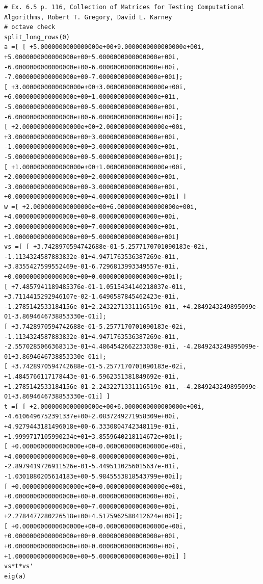 \documentclass[12pt]{article}
\begin{document}
{\fontsize{8.5pt}{0.4cm}\selectfont
\begin{verbatim}
# Ex. 6.5 p. 116, Collection of Matrices for Testing Computational Algorithms, Robert T. Gregory, David L. Karney
# octave check
split_long_rows(0)
a =[ [ +5.0000000000000000e+00+9.0000000000000000e+00i, +5.0000000000000000e+00+5.0000000000000000e+00i,
-6.0000000000000000e+00-6.0000000000000000e+00i, -7.0000000000000000e+00-7.0000000000000000e+00i];
[ +3.0000000000000000e+00+3.0000000000000000e+00i, +6.0000000000000000e+00+1.0000000000000000e+01i,
-5.0000000000000000e+00-5.0000000000000000e+00i, -6.0000000000000000e+00-6.0000000000000000e+00i];
[ +2.0000000000000000e+00+2.0000000000000000e+00i, +3.0000000000000000e+00+3.0000000000000000e+00i,
-1.0000000000000000e+00+3.0000000000000000e+00i, -5.0000000000000000e+00-5.0000000000000000e+00i];
[ +1.0000000000000000e+00+1.0000000000000000e+00i, +2.0000000000000000e+00+2.0000000000000000e+00i,
-3.0000000000000000e+00-3.0000000000000000e+00i, +0.0000000000000000e+00+4.0000000000000000e+00i] ]
w =[ +2.0000000000000000e+00+6.0000000000000000e+00i, +4.0000000000000000e+00+8.0000000000000000e+00i,
+3.0000000000000000e+00+7.0000000000000000e+00i, +1.0000000000000000e+00+5.0000000000000000e+00i]
vs =[ [ +3.7428970594742688e-01-5.2577170701090183e-02i, -1.1134324587883832e-01+4.9471763536387269e-01i,
+3.8355427599552469e-01-6.7296813993349557e-01i, +0.0000000000000000e+00+0.0000000000000000e+00i];
[ +7.4857941189485376e-01-1.0515434140218037e-01i, +3.7114415292946107e-02-1.6490587845462423e-01i,
-1.2785142533184156e-01+2.2432271331116519e-01i, +4.2849243249895099e-01-3.8694646738853330e-01i];
[ +3.7428970594742688e-01-5.2577170701090183e-02i, -1.1134324587883832e-01+4.9471763536387269e-01i,
-2.5570285066368313e-01+4.4864542662233038e-01i, -4.2849243249895099e-01+3.8694646738853330e-01i];
[ +3.7428970594742688e-01-5.2577170701090183e-02i, +1.4845766117178443e-01-6.5962351381849692e-01i,
+1.2785142533184156e-01-2.2432271331116519e-01i, -4.2849243249895099e-01+3.8694646738853330e-01i] ]
t =[ [ +2.0000000000000000e+00+6.0000000000000000e+00i, -4.6106496752391337e+00+2.0837249271958309e+00i,
+4.9279443181496018e+00-6.3330804742348119e-01i, +1.9999717105990234e+01+3.8559640218114672e+00i];
[ +0.0000000000000000e+00+0.0000000000000000e+00i, +4.0000000000000000e+00+8.0000000000000000e+00i,
-2.8979419726911526e-01-5.4495110256015637e-01i, -1.0301880205614183e+00-5.9845553818543799e+00i];
[ +0.0000000000000000e+00+0.0000000000000000e+00i, +0.0000000000000000e+00+0.0000000000000000e+00i,
+3.0000000000000000e+00+7.0000000000000000e+00i, +2.2784477280226518e+00+4.5175962580412624e+00i];
[ +0.0000000000000000e+00+0.0000000000000000e+00i, +0.0000000000000000e+00+0.0000000000000000e+00i,
+0.0000000000000000e+00+0.0000000000000000e+00i, +1.0000000000000000e+00+5.0000000000000000e+00i] ]
vs*t*vs'
eig(a)
\end{verbatim}
}
\end{document}
